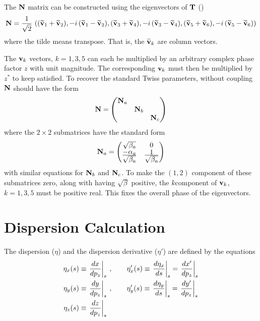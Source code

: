 The ${\bf N}$ matrix can be constructed using the eigenvectors of ${\bf T}$ ()
\begin{equation}
  {\bf N} = \frac{1}{\sqrt{2}} \, \left( 
    (\widetilde{{\bf v}}_1 + \widetilde{{\bf v}}_2), -i \, (\widetilde{{\bf v}}_1 - \widetilde{{\bf v}}_2), 
    (\widetilde{{\bf v}}_3 + \widetilde{{\bf v}}_4), -i \, (\widetilde{{\bf v}}_3 - \widetilde{{\bf v}}_4), 
    (\widetilde{{\bf v}}_5 + \widetilde{{\bf v}}_6), -i \, (\widetilde{{\bf v}}_5 - \widetilde{{\bf v}}_6)
  \right)
\end{equation}
where the tilde means transpose. That is, the $\widetilde{{\bf v}}_k$ are column vectors.

The ${\bf v}_k$ vectors, $k = 1, 3, 5$ can each be multiplied by an arbitrary complex phase factor $z$
with unit magnitude. The corresponding ${\bf v}_k$ must then be multiplied by $z^*$
to keep  satisfied. To recover the standard Twiss parameters, without coupling ${\bf N}$
should have the form
\begin{equation}
  {\bf N} = \begin{pmatrix}
    {\bf N}_a &        &        \\
           & {\bf N}_b &        \\
           &        & {\bf N}_c
  \end{pmatrix}
\end{equation}
where the $2 \times 2$ submatrices have the standard form
\begin{equation}
  {\bf N}_a = \begin{pmatrix}
    \sqrt{\beta_a}                                   & 0 \cr
    \frac{\textstyle -\alpha_a}{\textstyle \sqrt{\beta_a}} & \frac{\textstyle 1}{\textstyle \sqrt{\beta_a}}
  \end{pmatrix}
\end{equation}
with similar equations for ${\bf N}_b$ and ${\bf N}_c$. To make the $(1,2)$ component of these submatrices
zero, along with having $\sqrt{\beta}$ positive, the $k$\Th component of ${\bf v}_k$, $k = 1, 3, 5$
must be positive real. This fixes the overall phase of the eigenvectors.

\section{Dispersion Calculation}
\label{s:dispersion}

The dispersion ($\eta$) and the dispersion derivative ($\eta'$) are defined by the equations
\begin{align}
  \eta_x(s) &\equiv \left. \frac{dx}{dp_z} \right|_s \> , \qquad
    \eta'_x(s) \equiv \left. \frac{d\eta_x}{ds} \right|_s
    = \left. \frac{dx'}{dp_z} \right|_s \nonumber \\
  \eta_y(s) &\equiv \left. \frac{dy}{dp_z} \right|_s \> , \qquad
    \eta'_y(s) \equiv \left. \frac{d\eta_y}{ds} \right|_s
    = \left. \frac{dy'}{dp_z} \right|_s \\
  \eta_z(s) &\equiv \left. \frac{dz}{dp_z} \right|_s \nonumber
\end{align}

